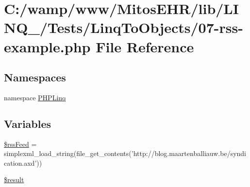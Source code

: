 \hypertarget{07-rss-example_8php}{\section{\-C\-:/wamp/www/\-Mitos\-E\-H\-R/lib/\-L\-I\-N\-Q\-\_/\-Tests/\-Linq\-To\-Objects/07-\/rss-\/example.php \-File \-Reference}
\label{07-rss-example_8php}
}
\subsection*{\-Namespaces}
\begin{DoxyCompactItemize}
\item 
namespace \hyperlink{namespace_p_h_p_linq}{\-P\-H\-P\-Linq}
\end{DoxyCompactItemize}
\subsection*{\-Variables}
\begin{DoxyCompactItemize}
\item 
\hyperlink{07-rss-example_8php_a873413e639a7eab732b8b9501375c904}{\$rss\-Feed} = simplexml\-\_\-load\-\_\-string(file\-\_\-get\-\_\-contents('http\-://blog.\-maartenballiauw.\-be/syndication.\-axd'))
\item 
\hyperlink{07-rss-example_8php_a112ef069ddc0454086e3d1e6d8d55d07}{\$result}
\end{DoxyCompactItemize}


